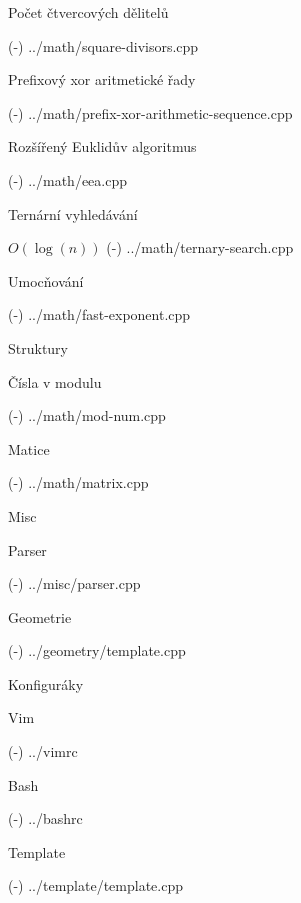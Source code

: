 \sec Počet čtvercových dělitelů 

\verbinput (-) ../math/square-divisors.cpp

\sec Prefixový xor aritmetické řady 

\verbinput (-) ../math/prefix-xor-arithmetic-sequence.cpp

\sec Rozšířený Euklidův algoritmus 

\verbinput (-) ../math/eea.cpp

\sec Ternární vyhledávání 

$O(\log(n))$
\verbinput (-) ../math/ternary-search.cpp

\sec Umocňování 

\verbinput (-) ../math/fast-exponent.cpp

\sec Struktury 


\secc Čísla v modulu 

\verbinput (-) ../math/mod-num.cpp

\secc Matice 

\verbinput (-) ../math/matrix.cpp

\newpage

\chap Misc

\sec Parser 

\verbinput (-) ../misc/parser.cpp

\newpage

\chap Geometrie

\verbinput (-) ../geometry/template.cpp

\newpage

\chap Konfiguráky

\sec Vim 

\verbinput (-) ../vimrc

\sec Bash 

\verbinput (-) ../bashrc

\sec Template 

\verbinput (-) ../template/template.cpp

\bye
